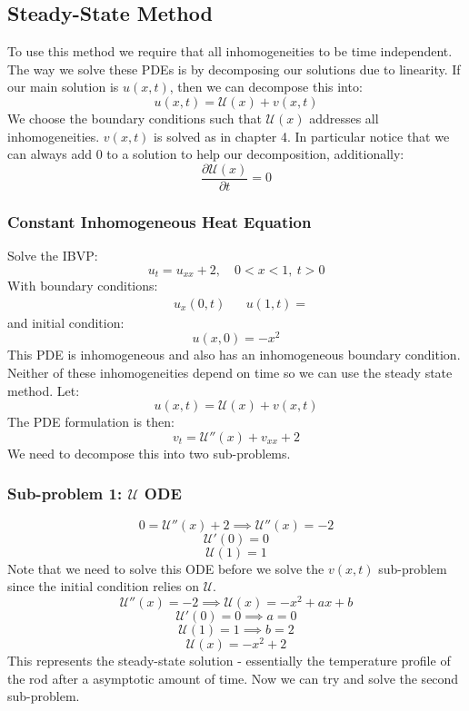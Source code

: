 \documentclass[12pt]{article}
\newcommand{\pf}[2]{\frac{\partial #1}{\partial #2}}
\begin{document}
\subsection{Steady-State Method}
To use this method we require that all inhomogeneities to be time independent. The way we solve these PDEs is by decomposing our solutions due to linearity. If our main solution is \(u(x,t)\), then we can decompose this into:
\[u(x,t)=\mathcal{U}(x)+v(x,t)\]
We choose the boundary conditions such that \(\mathcal{U}(x)\) addresses all inhomogeneities. \(v(x,t)\) is solved as in chapter 4. In particular notice that we can always add \(0\) to a solution to help our decomposition, additionally:
\[\pf{\mathcal{U}(x)}{t}=0\]
\subsubsection{Constant Inhomogeneous Heat Equation}
Solve the IBVP:
\[u_t=u_{xx}+2,\quad 0<x<1,\ t>0\]
With boundary conditions:
\begin{align*}
    &u_x(0,t) && u(1,t)=
\end{align*}
and initial condition:
\[u(x,0)=-x^2\]
This PDE is inhomogeneous and also has an inhomogeneous boundary condition. Neither of these inhomogeneities depend on time so we can use the steady state method. Let:
\[u(x,t)=\mathcal{U}(x)+v(x,t)\]
The PDE formulation is then:
\[v_t=\mathcal{U}''(x)+v_{xx}+2\]
We need to decompose this into two sub-problems.
\subsubsection{Sub-problem 1: \(\mathcal{U}\) ODE}
\[0=\mathcal{U}''(x)+2\implies \mathcal{U}''(x)=-2\]
\[\mathcal{U}'(0)=0\]
\[\mathcal{U}(1)=1\]
Note that we need to solve this ODE before we solve the \(v(x,t)\) sub-problem since the initial condition relies on \(\mathcal{U}\).
\[\mathcal{U}''(x)=-2\implies \mathcal{U}(x)=-x^2+ax+b\]
\[\mathcal{U}'(0)=0\implies a=0\]
\[\mathcal{U}(1)=1\implies b=2\]
\[\mathcal{U}(x)=-x^2+2\]
This represents the steady-state solution - essentially the temperature profile of the rod after a asymptotic amount of time. Now we can try and solve the second sub-problem.
\end{document}
